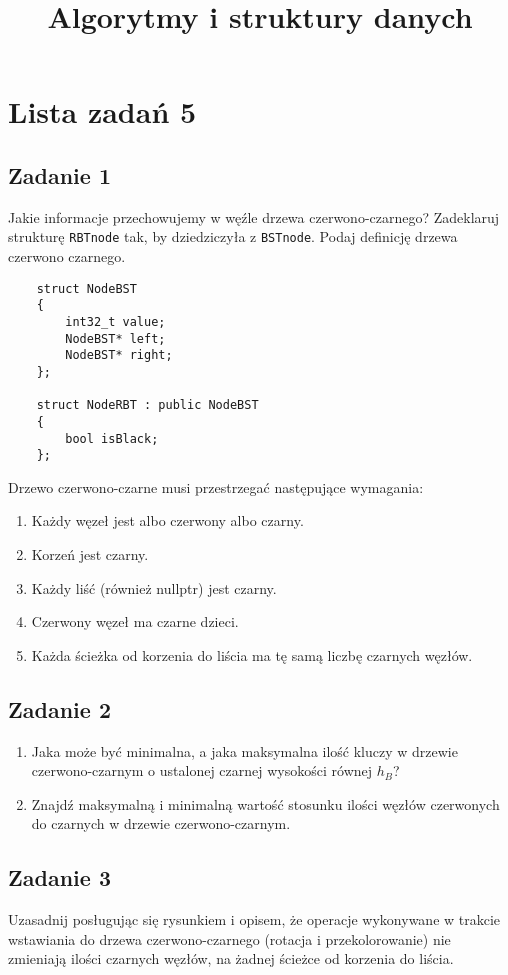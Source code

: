 \documentclass{article}
\begin{document}
\title{Algorytmy i struktury danych}
\author{}
\date{}
\maketitle

\section*{Lista zadań 5}

\subsection*{Zadanie 1}
Jakie informacje przechowujemy w węźle drzewa czerwono-czarnego?
Zadeklaruj strukturę \verb+RBTnode+ tak, by dziedziczyła z \verb+BSTnode+. Podaj definicję drzewa czerwono czarnego.
\begin{lstlisting}
    struct NodeBST
    {
        int32_t value;
        NodeBST* left;
        NodeBST* right;  
    };

    struct NodeRBT : public NodeBST
    {
        bool isBlack;
    };
\end{lstlisting}
Drzewo czerwono-czarne musi przestrzegać następujące wymagania:
\begin{enumerate}
    \item Każdy węzeł jest albo czerwony albo czarny.
    \item Korzeń jest czarny.
    \item Każdy liść (również nullptr) jest czarny.
    \item Czerwony węzeł ma czarne dzieci.
    \item Każda ścieżka od korzenia do liścia ma tę samą liczbę czarnych węzłów.
\end{enumerate}

\subsection*{Zadanie 2}
\begin{enumerate}[label=(\alph*)]
    \item Jaka może być minimalna, a jaka maksymalna ilość kluczy w drzewie czerwono-czarnym
          o ustalonej czarnej wysokości równej $h_B$?
    \item Znajdź maksymalną i minimalną wartość stosunku ilości węzłów czerwonych do
          czarnych w drzewie czerwono-czarnym.
\end{enumerate}

\subsection*{Zadanie 3}
Uzasadnij posługując się rysunkiem i opisem, że operacje wykonywane w trakcie wstawiania
do drzewa czerwono-czarnego (rotacja i przekolorowanie) nie zmieniają ilości
czarnych węzłów, na żadnej ścieżce od korzenia do liścia.
\end{document}
